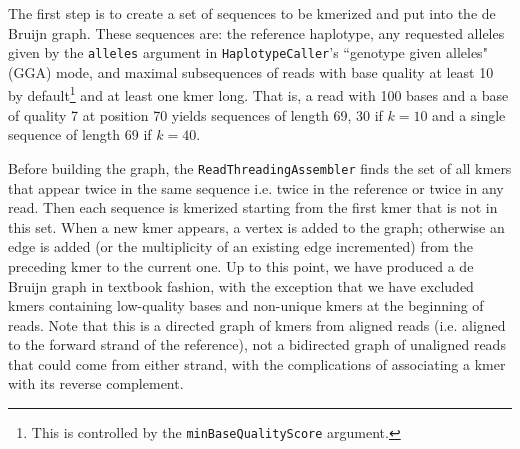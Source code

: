\documentclass[nofootinbib,amssymb,amsmath]{revtex4}
\newcommand{\HC}{\texttt{HaplotypeCaller}}
\newcommand{\code}[1]{\texttt{#1}}
\begin{document}
The first step is to create a set of sequences to be kmerized and put into the de Bruijn graph.  These sequences are: the reference haplotype, any requested alleles given by the \code{alleles} argument in \HC's ``genotype given alleles" (GGA) mode, and maximal subsequences of reads with base quality at least 10 by default\footnote{This is controlled by the \code{minBaseQualityScore} argument.} and at least one kmer long.  That is, a read with 100 bases and a base of quality 7 at position 70 yields sequences of length 69, 30 if $k = 10$ and a single sequence of length 69 if $k = 40$.

Before building the graph, the \code{ReadThreadingAssembler} finds the set of all kmers that appear twice in the same sequence i.e. twice in the reference or twice in any read.  Then each sequence is kmerized starting from the first kmer that is not in this set.  When a new kmer appears, a vertex is added to the graph; otherwise an edge is added (or the multiplicity of an existing edge incremented) from the preceding kmer to the current one.  Up to this point, we have produced a de Bruijn graph in textbook fashion, with the exception that we have excluded kmers containing low-quality bases and non-unique kmers at the beginning of reads.  Note that this is a directed graph of kmers from aligned reads (i.e. aligned to the forward strand of the reference), not a bidirected graph of unaligned reads that could come from either strand, with the complications of associating a kmer with its reverse complement.
\end{document}
